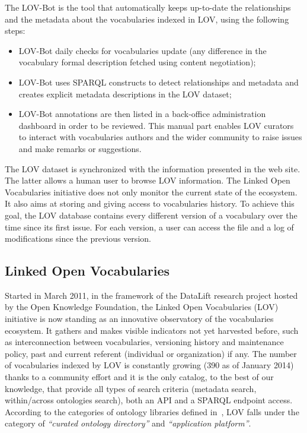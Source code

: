 The LOV-Bot is the tool that automatically keeps up-to-date the relationships and the metadata about the vocabularies indexed in LOV, using the following steps:
\begin{itemize}
  \item	LOV-Bot daily checks for vocabularies update (any difference in the vocabulary formal description fetched using content negotiation);
  \item	LOV-Bot uses SPARQL constructs to detect relationships and metadata and creates explicit metadata descriptions in the LOV dataset;
  \item	LOV-Bot annotations are then listed in a back-office administration dashboard in order to be reviewed. This manual part enables LOV curators to interact with vocabularies authors and the wider community to raise issues and make remarks or suggestions.
\end{itemize}
The LOV dataset is synchronized with the information presented in the web site. The latter allows a human user to browse LOV information.  The Linked Open Vocabularies initiative does not only monitor the current state of the ecosystem. It also aims at storing and giving access to vocabularies history. To achieve this goal, the LOV database contains every different version of a vocabulary over the time since its first issue. For each version, a user can access the file and a log of modifications since the previous version.

\subsection{Linked Open Vocabularies}     \label{sec:lov}

Started in March 2011, in the framework of the DataLift research project \cite{scharffe_2012} hosted by the Open Knowledge Foundation, the Linked Open Vocabularies (LOV) initiative is now standing as an innovative observatory of the vocabularies ecosystem. It gathers and makes visible indicators not yet harvested before, such as interconnection between vocabularies, versioning history and maintenance policy, past and current referent (individual or organization) if any. The number of vocabularies indexed by LOV is constantly growing (390 as of January 2014) thanks to a community effort and it is the only catalog, to the best of our knowledge, that provide all types of search criteria (metadata search, within/across ontologies search), both an API and a SPARQL endpoint access. According to the categories of ontology libraries defined in~\cite{AquinJoWS12}, LOV falls under the category of \textit{``curated ontology directory''}  and \textit{``application platform''}.

